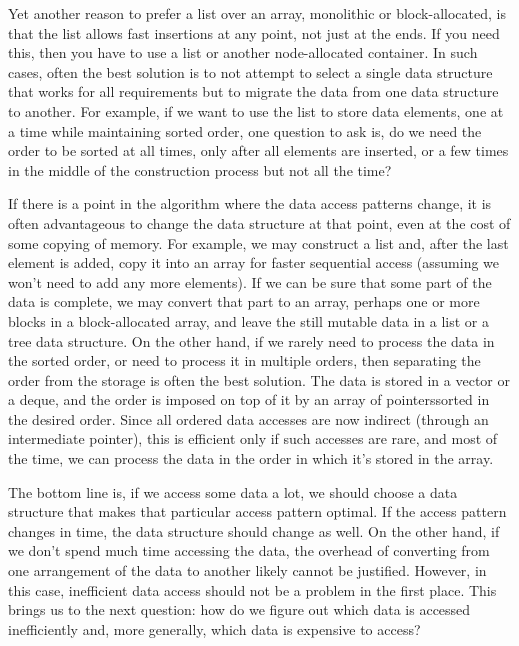 Yet another reason to prefer a list over an array, monolithic or block-allocated, is that the list allows fast insertions at any point, not just at the ends. If you need this, then you have to use a list or another node-allocated container. In such cases, often the best solution is to not attempt to select a single data structure that works for all requirements but to migrate the data from one data structure to another. For example, if we want to use the list to store data elements, one at a time while maintaining sorted order, one question to ask is, do we need the order to be sorted at all times, only after all elements are inserted, or a few times in the middle of the construction process but not all the time?

If there is a point in the algorithm where the data access patterns change, it is often advantageous to change the data structure at that point, even at the cost of some copying of memory. For example, we may construct a list and, after the last element is added, copy it into an array for faster sequential access (assuming we won't need to add any more elements). If we can be sure that some part of the data is complete, we may convert that part to an array, perhaps one or more blocks in a block-allocated array, and leave the still mutable data in a list or a tree data structure. On the other hand, if we rarely need to process the data in the sorted order, or need to process it in multiple orders, then separating the order from the storage is often the best solution. The data is stored in a vector or a deque, and the order is imposed on top of it by an array of pointerssorted in the desired order.  Since all ordered data accesses are now indirect (through an intermediate pointer), this is efficient only if such accesses are rare, and most of the time, we can process the data in the order in which it's stored in the array.

The bottom line is, if we access some data a lot, we should choose a data structure that makes that particular access pattern optimal. If the access pattern changes in time, the data structure should change as well. On the other hand, if we don't spend much time accessing the data, the overhead of converting from one arrangement of the data to another likely cannot be justified. However, in this case, inefficient data access should not be a problem in the first place. This brings us to the next question: how do we figure out which data is accessed inefficiently and, more generally, which data is expensive to access?

